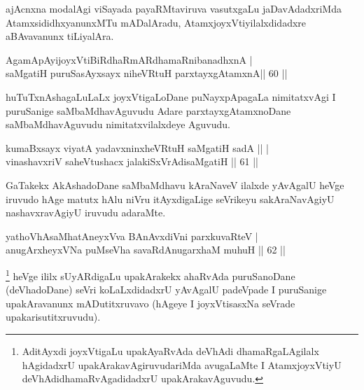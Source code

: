 \begin{artha}
ajAcnxna modalAgi viSayada payaRMtaviruva vasutxgaLu jaDavAdadxriMda AtamxsididhxyanunxMTu mADalAradu, AtamxjoyxVtiyilalxdidadxre aBAvavanunx tiLiyalAra.
\end{artha}


\begin{shl}
AgamApAyijoyxVtiBiRdhaRmARdhamaRnibanadhxnA | \\
saMgatiH puruSasAyxsayx niheVRtuH parxtayxgAtamxnA\hfill ||  60 ||  
\end{shl}

\begin{artha}
huTuTxnAshagaLuLaLx joyxVtigaLoDane puNayxpApagaLa nimitatxvAgi I puruSanige saMbaMdhavAguvudu Adare parxtayxgAtamxnoDane saMbaMdhavAguvudu nimitatxvilalxdeye Aguvudu.
\end{artha}


\begin{shl}
kumaBxsayx viyatA yadavxninxheVRtuH saMgatiH sadA ||  | \\
vinashavxriV saheVtushacx jalakiSxVrAdisaMgatiH \hfill||  61 ||  
\end{shl}

\begin{artha}
GaTakekx AkAshadoDane saMbaMdhavu kAraNaveV ilalxde yAvAgalU heVge iruvudo hAge matutx hAlu niVru itAyxdigaLige seVrikeyu sakAraNavAgiyU nashavxravAgiyU iruvudu adaraMte.
\end{artha}


\begin{shl}
yathoVhAsaMhatAneyxVva BAnAvxdiVni parxkuvaRteV | \\
anugArxheyxVNa puMseVha savaRdA\s nugarxhaM muhuH \hfill ||  62 ||  
\end{shl}

\begin{artha}
\footnote{AditAyxdi joyxVtigaLu upakAyaRvAda deVhAdi dhamaRgaLAgilalx hAgidadxrU upakArakavAgiruvudariMda avugaLaMte I AtamxjoyxVtiyU deVhAdidhamaRvAgadidadxrU upakArakavAguvudu.} heVge ililx sUyARdigaLu upakArakekx ahaRvAda puruSanoDane (deVhadoDane) seVri koLaLxdidadxrU yAvAgalU padeVpade I puruSanige upakAravanunx mADutitxruvavo (hAgeye I joyxVtisasxNa seVrade upakarisutitxruvudu).
\end{artha}

